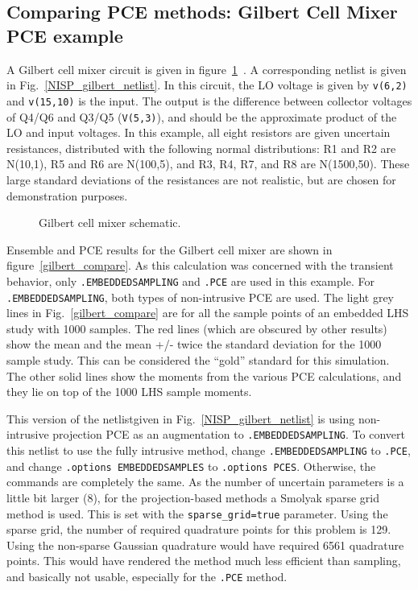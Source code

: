 \clearpage
\subsection{Comparing PCE methods: Gilbert Cell Mixer PCE example}
\label{xyceGilbertCell}
A Gilbert cell mixer circuit is given in figure~\ref{gilbert}~\cite{1049925}.  A corresponding netlist 
is given in Fig.~\ref{NISP_gilbert_netlist}.
In this circuit, the LO voltage is given by \texttt{v(6,2)} and \texttt{v(15,10)} is the input. 
The output is the difference between collector voltages of Q4/Q6 and Q3/Q5 (\texttt{V(5,3)}), 
and should be the approximate product of the LO and input voltages.
In this example, all eight resistors are given uncertain resistances,
distributed with the following normal distributions:  R1 and R2 are N(10,1), R5
and R6 are N(100,5), and R3, R4, R7, and R8 are N(1500,50).  These large
standard deviations of the resistances are not realistic, but are chosen for
demonstration purposes.
\begin{figure}[hbt]
\centering
\resizebox{.9\linewidth}{!}{ }
  \caption[Gilbert cell mixer schematic]
  {Gilbert cell mixer schematic.}
\label{gilbert}
\end{figure}

Ensemble and PCE results for the Gilbert cell mixer are shown in figure~\ref{gilbert_compare}.   
As this calculation was concerned with the transient behavior, only \texttt{.EMBEDDEDSAMPLING} 
and \texttt{.PCE} are used in this example.  For \texttt{.EMBEDDEDSAMPLING}, both types of 
non-intrusive PCE are used.
The light grey lines in Fig.~\ref{gilbert_compare} are for all the sample points 
of an embedded LHS study with 1000 samples.    The red lines (which are obscured 
by other results) show the mean and the mean +/- twice the standard deviation for the 
1000 sample study.  This can be considered the ``gold'' standard for this simulation.
The other solid lines show the moments from the various PCE calculations, and they 
lie on top of the 1000 LHS sample moments.  

This version of the netlistgiven in Fig.~\ref{NISP_gilbert_netlist}
is using non-intrusive projection PCE as an augmentation to \texttt{.EMBEDDEDSAMPLING}.  
To convert this netlist to 
use the fully intrusive method, change \texttt{.EMBEDDEDSAMPLING} to \texttt{.PCE}, and 
change \texttt{.options EMBEDDEDSAMPLES} to \texttt{.options PCES}.   Otherwise, the commands are completely the same.
As the number of uncertain parameters is a little bit larger (8), for the projection-based methods a 
Smolyak sparse grid~\cite{Smolyak_63} method is used.  This is set with the  \texttt{sparse\_grid=true} parameter. 
Using the sparse grid, the number of 
required quadrature points for this problem is 129.  Using the non-sparse Gaussian quadrature 
would have required 6561 quadrature points. This would have rendered the method much 
less efficient than sampling, and basically not usable, especially for the \texttt{.PCE} method.

